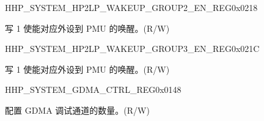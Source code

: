 {\begin{register}{H}{HP\_SYSTEM\_HP2LP\_WAKEUP\_GROUP2\_EN\_REG}{0x0218}\label{regdesc:HPSYSTEMHP2LPWAKEUPGROUP2ENREG}
%
\regnewline%
\begin{regdesc}\begin{reglist}
\label{fielddesc:HPSYSTEMH2LPWAKEUPGROUP2EN}\item [HP\_SYSTEM\_H2LP\_WAKEUP\_GROUP2\_EN] 写 1 使能对应外设到 PMU 的唤醒。(R/W)
\end{reglist}\end{regdesc}
\end{register}


\begin{register}{H}{HP\_SYSTEM\_HP2LP\_WAKEUP\_GROUP3\_EN\_REG}{0x021C}\label{regdesc:HPSYSTEMHP2LPWAKEUPGROUP3ENREG}
%
%
\regnewline%
\begin{regdesc}\begin{reglist}
\label{fielddesc:HPSYSTEMH2LPWAKEUPGROUP3EN}\item [HP\_SYSTEM\_H2LP\_WAKEUP\_GROUP3\_EN] 写 1 使能对应外设到 PMU 的唤醒。(R/W)
\end{reglist}\end{regdesc}
\end{register}

}


\begin{register}{H}{HP\_SYSTEM\_GDMA\_CTRL\_REG}{0x0148}\label{regdesc:HPSYSTEMGDMACTRLREG}
%
%
\regnewline%
\begin{regdesc}\begin{reglist}
\label{fielddesc:HPSYSTEMSYSDEBUGCHNUM}\item [HP\_SYSTEM\_SYS\_DEBUG\_CH\_NUM] 配置 GDMA 调试通道的数量。(R/W)
\end{reglist}\end{regdesc}
\end{register}


